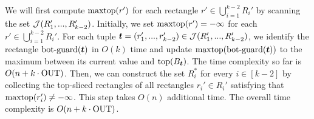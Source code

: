 We will first compute $\mathrm{maxtop}(r')$ for each rectangle $r' \in \bigcup_{i = 1}^{k-2}R_{i}'$ by scanning the set $\mathcal{J}(R_1',...,R_{k-2}')$. Initially, we set $\mathrm{maxtop}(r') = -\infty$ for each $r' \in \bigcup_{i = 1}^{k-2}R_{i}'$. For each tuple $\textrm{\boldmath${t}$} = (r_1',...,r_{k-2}') \in \mathcal{J}(R_1',...,R_{k-2}')$, we identify the rectangle $\mathrm{bot\text{-}guard}(\textrm{\boldmath${t}$})$ in $O(k)$ time and 
 update $\mathrm{maxtop}(\mathrm{bot\text{-}guard}(\textrm{\boldmath${t}$}))$ to the maximum between its current value and $\mathrm{top}(B_{\textrm{\boldmath${t}$}})$. The time complexity so far is $O(n + k\cdot \mathrm{OUT})$.
Then, we can construct the set $R_i^*$ for every $i \in [k-2]$ by collecting the top-sliced rectangles of all rectangles $r_i' \in R_i'$ satisfying that $\mathrm{maxtop}(r_i')\neq -\infty$. This step takes $O(n)$ additional time. The overall time complexity is $O(n + k\cdot \mathrm{OUT})$.